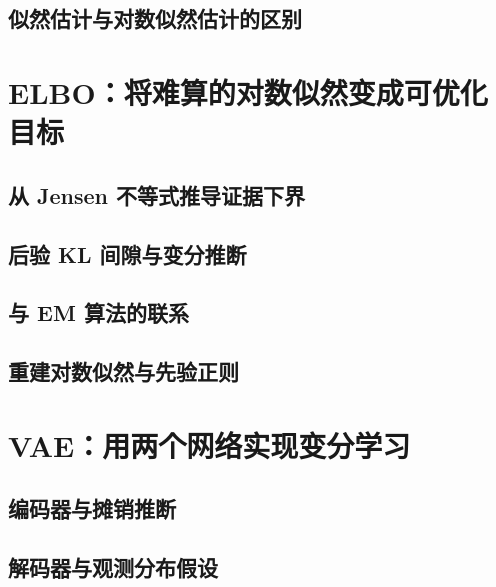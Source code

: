 \subsection{似然估计与对数似然估计的区别}
\label{subsec:vae-log-bias}
\contentplaceholder

\section{ELBO：将难算的对数似然变成可优化目标}
\label{sec:vae-elbo}
\contentplaceholder

\subsection{从 Jensen 不等式推导证据下界}
\label{subsec:vae-jensen}
\contentplaceholder

\subsection{后验 KL 间隙与变分推断}
\label{subsec:vae-posterior-gap}
\contentplaceholder

\subsection{与 EM 算法的联系}
\label{subsec:vae-em}
\contentplaceholder

\subsection{重建对数似然与先验正则}
\label{subsec:vae-decomposition}
\contentplaceholder

\section{VAE：用两个网络实现变分学习}
\label{sec:vae-networks}
\contentplaceholder

\subsection{编码器与摊销推断}
\label{subsec:vae-amortized}
\contentplaceholder

\subsection{解码器与观测分布假设}
\label{subsec:vae-observation}
\contentplaceholder

